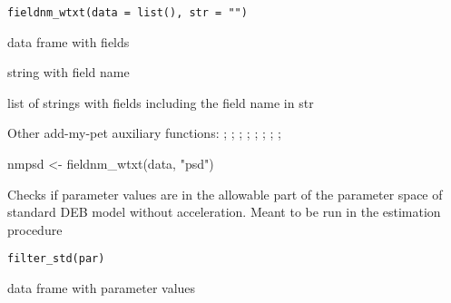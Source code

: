 \documentclass[a4paper]{book}
\begin{document}
%
\begin{Usage}
\begin{verbatim}
fieldnm_wtxt(data = list(), str = "")
\end{verbatim}
\end{Usage}
%
\begin{Arguments}
\begin{ldescription}
\item[\code{data}] data frame with fields

\item[\code{str}] string with field name
\end{ldescription}
\end{Arguments}
%
\begin{Value}
list of strings with fields including the field name in str
\end{Value}
%
\begin{SeeAlso}\relax
Other add-my-pet auxiliary functions: ;
; ;
; ;
;
;
; 
\end{SeeAlso}
%
\begin{Examples}
\begin{ExampleCode}
nmpsd <- fieldnm_wtxt(data, "psd")
\end{ExampleCode}
\end{Examples}
%
\begin{Description}\relax
Checks if parameter values are in the allowable part of the parameter space of
standard DEB model without acceleration. Meant to be run in the estimation procedure
\end{Description}
%
\begin{Usage}
\begin{verbatim}
filter_std(par)
\end{verbatim}
\end{Usage}
%
\begin{Arguments}
\begin{ldescription}
\item[\code{par}] data frame with parameter values
\end{ldescription}
\end{Arguments}
\end{document}
